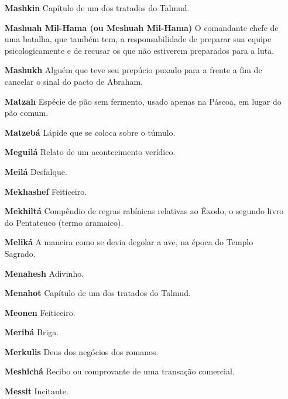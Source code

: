 \begin{itemize}
\item[\textbf{Mashkin}] Capítulo de um dos trata­dos do Talmud.

\item[\textbf{Mashuah Mil-Hama (ou Meshuah Mil-Hama)}] O comandante chefe de
uma batalha, que também tem, a res­ponsabilidade de preparar sua equipe
psicologicamente e de recusar os que não estiverem preparados para a
luta.

\item[\textbf{Mashukh}] Alguém que teve seu pre­púcio puxado para a
frente a fim de cancelar o sinal do pacto de Abraham.

\item[\textbf{Matzah}] Espécie de pão sem fermen­to, usado apenas na Páscoa, em lugar do pão
comum.

\item[\textbf{Matzebá}] Lápide que se coloca sobre o túmulo.

\item[\textbf{Meguilá}] Relato de um acontecimen­to verídico.


\item[\textbf{Meilá}] Desfalque.

\item[\textbf{Mekhashef}] Feiticeiro.

\item[\textbf{Mekhiltá}] Compêndio de regras rabí­nicas relativas ao Êxodo, o
segundo li­vro do Pentateuco (termo aramaico).

\item[\textbf{Meliká}] A maneira como se devia dego­lar a ave, na época do Templo Sagrado.

\item[\textbf{Menahesh}] Adivinho.

\item[\textbf{Menahot}] Capítulo de um dos trata­dos do Talmud.

\item[\textbf{Meonen}] Feiticeiro.

\item[\textbf{Meribá}] Briga.

\item[\textbf{Merkulis}] Deus dos negócios dos ro­manos.

\item[\textbf{Meshichá}] Recibo ou comprovante de uma transação comercial.

\item[\textbf{Messit}] Incitante.


\end{itemize}
